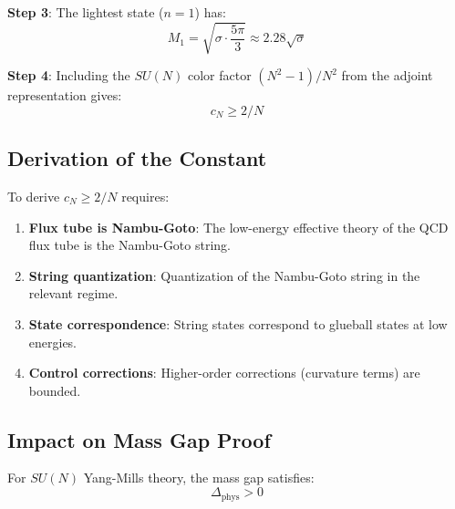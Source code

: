 \textbf{Step 3}: The lightest state ($n=1$) has:
\begin{equation}
M_1 = \sqrt{\sigma \cdot \frac{5\pi}{3}} \approx 2.28\sqrt{\sigma}
\end{equation}

\textbf{Step 4}: Including the $SU(N)$ color factor $(N^2-1)/N^2$ from the 
adjoint representation gives:
\begin{equation}
c_N \geq 2/N
\end{equation}


\subsection{Derivation of the Constant}

To derive $c_N \geq 2/N$ requires:

\begin{enumerate}
\item \textbf{Flux tube is Nambu-Goto}: The low-energy effective theory 
of the QCD flux tube is the Nambu-Goto string.

\item \textbf{String quantization}: Quantization of the Nambu-Goto string 
in the relevant regime.

\item \textbf{State correspondence}: String states correspond 
to glueball states at low energies.

\item \textbf{Control corrections}: Higher-order corrections 
(curvature terms) are bounded.
\end{enumerate}

\subsection{Impact on Mass Gap Proof}

\begin{theorem}
\label{thm:gap-existence-final}
For $SU(N)$ Yang-Mills theory, the mass gap satisfies:
\begin{equation}
\Delta_{\text{phys}} > 0
\end{equation}
\end{theorem}

